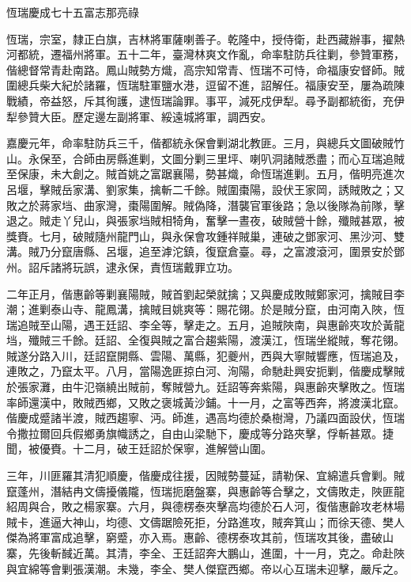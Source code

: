 
\begin{pinyinscope}
恆瑞慶成七十五富志那亮祿

恆瑞，宗室，隸正白旗，吉林將軍薩喇善子。乾隆中，授侍衛，赴西藏辦事，擢熱河都統，遷福州將軍。五十二年，臺灣林爽文作亂，命率駐防兵往剿，參贊軍務，偕總督常青赴南路。鳳山賊勢方熾，高宗知常青、恆瑞不可恃，命福康安督師。賊圍總兵柴大紀於諸羅，恆瑞駐軍鹽水港，逗留不進，詔解任。福康安至，屢為疏陳戰績，帝益怒，斥其徇護，逮恆瑞論罪。事平，減死戍伊犁。尋予副都統銜，充伊犁參贊大臣。歷定邊左副將軍、綏遠城將軍，調西安。

嘉慶元年，命率駐防兵三千，偕都統永保會剿湖北教匪。三月，與總兵文圖破賊竹山。永保至，合師由房縣進剿，文圖分剿三里坪、喇叭洞諸賊悉盡；而心互瑞追賊至保康，未大創之。賊首姚之富踞襄陽，勢甚熾，命恆瑞進剿。五月，偕明亮進次呂堰，擊賊岳家溝、劉家集，擒斬二千餘。賊圍棗陽，設伏王家岡，誘賊敗之；又敗之於蔣家垱、曲家灣，棗陽圍解。賊偽降，潛襲官軍後路；急以後隊為前隊，擊退之。賊走丫兒山，與張家垱賊相犄角，奮擊一晝夜，破賊營十餘，殲賊甚眾，被獎賚。七月，破賊隨州龍門山，與永保會攻鍾祥賊巢，連破之鄧家河、黑沙河、雙溝。賊乃分竄唐縣、呂堰，追至滹沱鎮，復竄倉臺。尋，之富渡滾河，圍景安於鄧州。詔斥諸將玩誤，逮永保，責恆瑞戴罪立功。

二年正月，偕惠齡等剿襄陽賊，賊首劉起榮就擒；又與慶成敗賊鄭家河，擒賊目李潮；進剿泰山寺、龍鳳溝，擒賊目姚爽等：賜花翎。於是賊分竄，由河南入陜，恆瑞追賊至山陽，遇王廷詔、李全等，擊走之。五月，追賊陜南，與惠齡夾攻於黃龍垱，殲賊三千餘。廷詔、全復與賊之富合趨紫陽，渡漢江，恆瑞坐縱賊，奪花翎。賊遂分路入川，廷詔竄開縣、雲陽、萬縣，犯夔州，西與大寧賊響應，恆瑞追及，連敗之，乃竄太平。八月，當陽逸匪掠白河、洵陽，命馳赴興安扼剿，偕慶成擊賊於張家灘，由牛氾嶺繞出賊前，奪賊營九。廷詔等奔紫陽，與惠齡夾擊敗之。恆瑞率師還漢中，敗賊西鄉，又敗之褒城黃沙鋪。十一月，之富等西奔，將渡漢北竄。偕慶成蹙諸半渡，賊西趨寧、沔。師進，遇高均德於桑樹灣，乃議四面設伏，恆瑞令撒拉爾回兵假鄉勇旗幟誘之，自由山梁馳下，慶成等分路夾擊，俘斬甚眾。捷聞，被優賚。十二月，破王廷詔於保寧，進解營山圍。

三年，川匪羅其清犯順慶，偕慶成往援，因賊勢蔓延，請勒保、宜綿遣兵會剿。賊竄蓬州，潛結冉文儔擾儀隴，恆瑞扼磨盤寨，與惠齡等合擊之，文儔敗走，陜匪龍紹周與合，敗之楊家寨。六月，與德楞泰夾擊高均德於石人河，復偕惠齡攻老林場賊卡，進逼大神山，均德、文儔踞險死拒，分路進攻，賊奔箕山；而徐天德、樊人傑為將軍富成追擊，窮蹙，亦入焉。惠齡、德楞泰攻其前，恆瑞攻其後，盡破山寨，先後斬馘近萬。其清，李全、王廷詔奔大鵬山，進圍，十一月，克之。命赴陜與宜綿等會剿張漢潮。未幾，李全、樊人傑竄西鄉。帝以心互瑞未迎擊，嚴斥之。


\end{pinyinscope}
